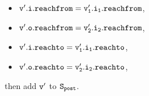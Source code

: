 \begin{itemize}
\begin{enumerate}
\begin{itemize}
\item $\tt v'.i.reachfrom = v_1'.i_1.reachfrom$,
\item $\tt v'.o.reachfrom = v_2'.i_2.reachfrom$,
\item $\tt v'.i.reachto = v_1'.i_1.reachto$,
\item $\tt v'.o.reachto = v_2'.i_2.reachto$,
\end{itemize} then add $\tt v'$ to $\tt S_{post}$. 
\end{enumerate}
%

\end{itemize}
